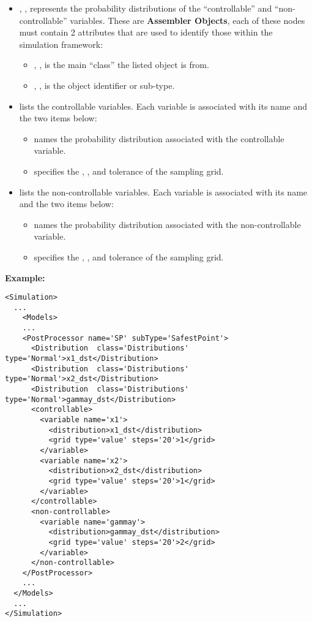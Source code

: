 \begin{itemize}
  \item {}, , represents the probability
  distributions of the ``controllable'' and ``non-controllable'' variables.
  These are \textbf{Assembler Objects}, each of these nodes must contain 2
  attributes that are used to identify those within the simulation framework:
	\begin{itemize}
    \item {}, , is the main
    ``class'' the listed object is from.
 		\item {}, , is the object
    identifier or sub-type.
	\end{itemize}
	\item {} lists the controllable variables.
  Each variable is associated with its name and the two items below:
	\begin{itemize}
		\item {} names the probability distribution associated
    with the controllable variable.
		\item {} specifies the , , and
    tolerance of the sampling grid.
	\end{itemize}
	\item {} lists the non-controllable variables.
  Each variable is associated with its name and the two items below:
	\begin{itemize}
		\item {} names the probability distribution associated
    with the non-controllable variable.
		\item {} specifies the , , and
    tolerance of the sampling grid.
		\end{itemize}
\end{itemize}

\textbf{Example:}
\begin{lstlisting}[style=XML,morekeywords={name,subType,class,type,steps}]
<Simulation>
  ...
    <Models>
    ...
    <PostProcessor name='SP' subType='SafestPoint'>
      <Distribution  class='Distributions'  type='Normal'>x1_dst</Distribution>
      <Distribution  class='Distributions'  type='Normal'>x2_dst</Distribution>
      <Distribution  class='Distributions'  type='Normal'>gammay_dst</Distribution>
      <controllable>
        <variable name='x1'>
          <distribution>x1_dst</distribution>
          <grid type='value' steps='20'>1</grid>
        </variable>
        <variable name='x2'>
          <distribution>x2_dst</distribution>
          <grid type='value' steps='20'>1</grid>
        </variable>
      </controllable>
      <non-controllable>
        <variable name='gammay'>
          <distribution>gammay_dst</distribution>
          <grid type='value' steps='20'>2</grid>
        </variable>
      </non-controllable>
    </PostProcessor>
    ...
  </Models>
  ...
</Simulation>
\end{lstlisting}
